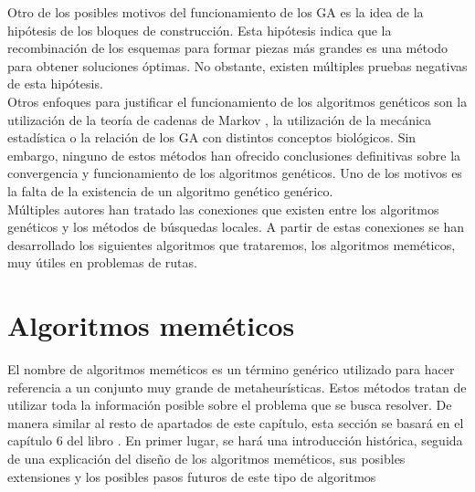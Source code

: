 Otro de los posibles motivos del funcionamiento de los GA es la idea de la hipótesis de los bloques de construcción. Esta hipótesis indica que la recombinación de los esquemas para formar piezas más grandes es una método para obtener soluciones óptimas. No obstante, existen múltiples pruebas negativas de esta hipótesis.\\

Otros enfoques para justificar el funcionamiento de los algoritmos genéticos son la utilización de la teoría de cadenas de Markov \cite{Vose1995ModelingSG}, la utilización de la mecánica estadística \cite{Shapiro1994ASM} o la relación de los GA con distintos conceptos biológicos. Sin embargo, ninguno de estos métodos han ofrecido conclusiones definitivas sobre la convergencia y funcionamiento de los algoritmos genéticos. Uno de los motivos es la falta de la existencia de un algoritmo genético genérico.\\

Múltiples autores han tratado las conexiones que existen entre los algoritmos genéticos y los métodos de búsquedas locales. A partir de estas conexiones se han desarrollado los siguientes algoritmos que trataremos, los algoritmos meméticos, muy útiles en problemas de rutas.
\section{Algoritmos meméticos}
El nombre de algoritmos meméticos es un término genérico utilizado para hacer referencia a un conjunto muy grande de metaheurísticas. Estos métodos tratan de utilizar toda la información posible sobre el problema que se busca resolver. De manera similar al resto de apartados de este capítulo, esta sección se basará en el capítulo 6 del libro \cite{metah-hb}. En primer lugar, se hará una introducción histórica, seguida de una explicación del diseño de los algoritmos meméticos, sus posibles extensiones y los posibles pasos futuros de este tipo de algoritmos

